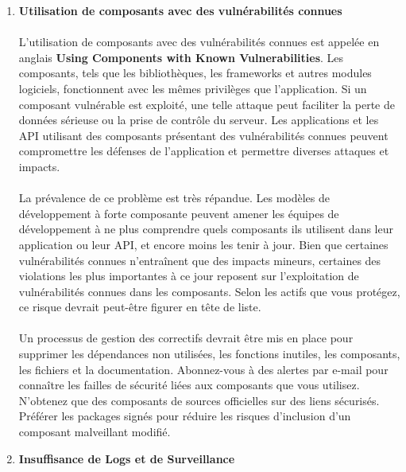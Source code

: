 \begin{enumerate}[label=\roman*)]
		\newpage
		\item \textbf{Utilisation de composants avec des vulnérabilités connues} \vspace*{-0.4cm}
		\paragraph{}
		L'utilisation de composants avec des vulnérabilités connues est appel\'ee en anglais \textbf{Using Components with Known Vulnerabilities}.
		Les composants, tels que les bibliothèques, les frameworks et autres modules logiciels, fonctionnent avec les mêmes privilèges que l'application. Si un composant vulnérable est exploité, une telle attaque peut faciliter la perte de données sérieuse ou la prise de contrôle du serveur. Les applications et les API utilisant des composants présentant des vulnérabilités connues peuvent compromettre les défenses de l'application et permettre diverses attaques et impacts.
		\paragraph{}
		La prévalence de ce problème est très répandue. Les modèles de développement à forte composante peuvent amener les équipes de développement à ne plus comprendre quels composants ils utilisent dans leur application ou leur API, et encore moins les tenir à jour. 
		Bien que certaines vulnérabilités connues n'entraînent que des impacts mineurs, certaines des violations les plus importantes à ce jour reposent sur l'exploitation de vulnérabilités connues dans les composants. Selon les actifs que vous protégez, ce risque devrait peut-être figurer en tête de liste.
		\paragraph{}
		Un processus de gestion des correctifs devrait être mis en place pour supprimer les dépendances non utilisées, les fonctions inutiles, les composants, les fichiers et la documentation. Abonnez-vous à des alertes par e-mail pour connaître les failles de sécurité liées aux composants que vous utilisez.
		N'obtenez que des composants de sources officielles sur des liens sécurisés. Préférer les packages signés pour réduire les risques d'inclusion d'un composant malveillant modifié.

		\vspace*{0.8cm} \item \textbf{Insuffisance de Logs et de Surveillance} \vspace*{-0.4cm}

\end{enumerate}
